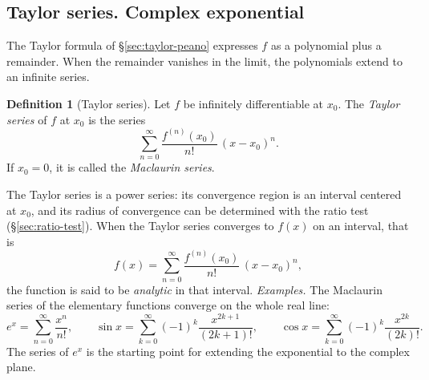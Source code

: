 \documentclass[11pt,a4paper]{article}
\theoremstyle{definition} \newtheorem{definition}{Definition} \theoremstyle{plain} \newtheorem{theorem}{Theorem}
\begin{document}
\subsection{Taylor series. Complex exponential}
The Taylor formula of \S\ref{sec:taylor-peano} expresses $f$ as a polynomial plus a remainder.
When the remainder vanishes in the limit, the polynomials extend to an infinite series.
\begin{definition}[Taylor series] Let $f$ be infinitely differentiable at $x_0$.
The \emph{Taylor series} of $f$ at $x_0$ is the series
\[ \sum_{n=0}^{\infty} \frac{f^{(n)}(x_0)}{n!}\,(x - x_0)^n. \]
If $x_0 = 0$, it is called the \emph{Maclaurin series}. \end{definition}
The Taylor series is a power series: its convergence region is an interval centered at $x_0$, and its radius of convergence can be determined with the ratio test (\S\ref{sec:ratio-test}).
When the Taylor series converges to $f(x)$ on an interval, that is
\[ f(x) = \sum_{n=0}^{\infty} \frac{f^{(n)}(x_0)}{n!}\,(x - x_0)^n, \]
the function is said to be \emph{analytic} in that interval.
\emph{Examples.} The Maclaurin series of the elementary functions converge on the whole real line:
\[ e^x = \sum_{n=0}^{\infty} \frac{x^n}{n!}, \qquad \sin x = \sum_{k=0}^{\infty} (-1)^k \frac{x^{2k+1}}{(2k+1)!}, \qquad \cos x = \sum_{k=0}^{\infty} (-1)^k \frac{x^{2k}}{(2k)!}. \]
The series of $e^x$ is the starting point for extending the exponential to the complex plane.
\end{document}
